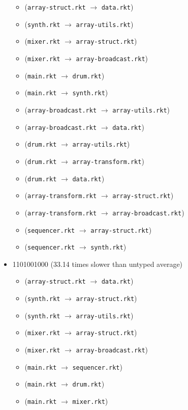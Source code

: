 \documentclass{article}
\newcommand{\mono}[1]{\texttt{#1}}
\begin{document}
\begin{itemize}
\begin{itemize}
  \item (\mono{array-struct.rkt} $\rightarrow$ \mono{data.rkt})
  \item (\mono{synth.rkt} $\rightarrow$ \mono{array-utils.rkt})
  \item (\mono{mixer.rkt} $\rightarrow$ \mono{array-struct.rkt})
  \item (\mono{mixer.rkt} $\rightarrow$ \mono{array-broadcast.rkt})
  \item (\mono{main.rkt} $\rightarrow$ \mono{drum.rkt})
  \item (\mono{main.rkt} $\rightarrow$ \mono{synth.rkt})
  \item (\mono{array-broadcast.rkt} $\rightarrow$ \mono{array-utils.rkt})
  \item (\mono{array-broadcast.rkt} $\rightarrow$ \mono{data.rkt})
  \item (\mono{drum.rkt} $\rightarrow$ \mono{array-utils.rkt})
  \item (\mono{drum.rkt} $\rightarrow$ \mono{array-transform.rkt})
  \item (\mono{drum.rkt} $\rightarrow$ \mono{data.rkt})
  \item (\mono{array-transform.rkt} $\rightarrow$ \mono{array-struct.rkt})
  \item (\mono{array-transform.rkt} $\rightarrow$ \mono{array-broadcast.rkt})
  \item (\mono{sequencer.rkt} $\rightarrow$ \mono{array-struct.rkt})
  \item (\mono{sequencer.rkt} $\rightarrow$ \mono{synth.rkt})
  \end{itemize}
\item 1101001000 (33.14 times slower than untyped average)
  \begin{itemize}
  \item (\mono{array-struct.rkt} $\rightarrow$ \mono{data.rkt})
  \item (\mono{synth.rkt} $\rightarrow$ \mono{array-struct.rkt})
  \item (\mono{synth.rkt} $\rightarrow$ \mono{array-utils.rkt})
  \item (\mono{mixer.rkt} $\rightarrow$ \mono{array-struct.rkt})
  \item (\mono{mixer.rkt} $\rightarrow$ \mono{array-broadcast.rkt})
  \item (\mono{main.rkt} $\rightarrow$ \mono{sequencer.rkt})
  \item (\mono{main.rkt} $\rightarrow$ \mono{drum.rkt})
  \item (\mono{main.rkt} $\rightarrow$ \mono{mixer.rkt})

\end{itemize}
\end{itemize}
\end{document}
